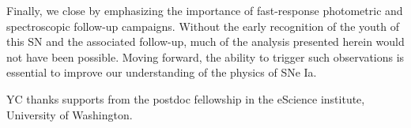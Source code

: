 \documentclass[twocolumn]{aastex61}
\begin{document}
Finally, we close by emphasizing the importance of fast-response photometric and spectroscopic follow-up campaigns. Without the early recognition of the youth of this SN and the associated follow-up, much of the analysis presented herein would not have been possible. Moving forward, the ability to trigger such observations is essential to improve our understanding of the physics of SNe Ia.

\acknowledgements

YC thanks supports from the postdoc fellowship in the eScience
institute, University of Washington.



\end{document}
